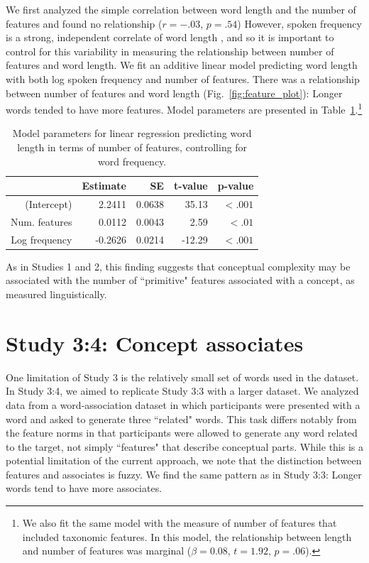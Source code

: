 We first analyzed the simple correlation between word length and the number of features and found no relationship ($r=-.03$, $p=.54$)  However, spoken frequency is a strong, independent correlate of word length \cite{zipf1936}, and so it is important to control for this variability in measuring the relationship between number of features and word length. We fit an additive linear model predicting word length with both log spoken frequency and number of features.  There was a  relationship between number of features and word length (Fig.\ \ref{fig:feature_plot}): Longer words tended to have more features. Model parameters are presented in Table~\ref{study3amodel}.\footnote{We also fit the same model with the measure of number of features that included taxonomic features. In this model, the relationship between length and number of features was marginal ($\beta=0.08$, $t =1.92$, $p=.06$).} 



\begin{table}[t!]
\centering
\begin{tabular}{rrrrr}
  \hline
 & Estimate & SE & t-value & p-value \\ 
  \hline
(Intercept) & 2.2411 & 0.0638 & 35.13 & $<.001$ \\ 
  Num. features & 0.0112 & 0.0043 & 2.59 & $<.01$\\ 
  Log frequency & -0.2626 & 0.0214 & -12.29 & $<.001$  \\ 
   \hline
\end{tabular}
\caption{Model parameters for linear regression predicting word length in terms of number of features, controlling for word frequency.}
\label{study3amodel}
\end{table}

As in Studies 1 and 2, this finding suggests that conceptual complexity may be associated with the number of ``primitive" features associated with a concept, as measured linguistically.

\section{Study 3:4: Concept associates}
One limitation of Study 3 is the relatively small set of words used in the dataset. In Study 3:4, we aimed to replicate Study 3:3 with a larger dataset. We analyzed data from a word-association dataset in which participants were presented with a word and asked to generate three ``related" words. This task differs notably from the feature norms in that participants were allowed to generate any word related to the target, not simply ``features" that describe conceptual parts. While this is a potential limitation of the current approach, we note that the distinction between features and associates is fuzzy. We find  the same pattern as in Study 3:3: Longer words tend to have more associates. 

